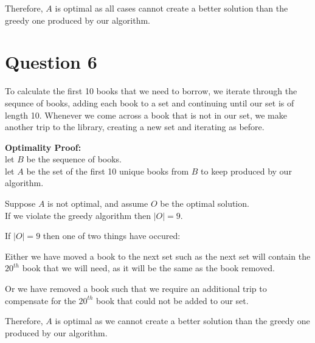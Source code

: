 \documentclass{article}
\begin{document}
Therefore, $A$ is optimal as all cases cannot create a better solution than the greedy one produced by our algorithm.

\section*{Question 6}
To calculate the first 10 books that we need to borrow, we iterate through the sequnce of books, adding each book to a set and continuing until our set is of length 10. Whenever we come across a book that is not in our set, we make another trip to the library, creating a new set and iterating as before.

\textbf{Optimality Proof:}\\
let $B$ be the sequence of books.\\
let $A$ be the set of the first 10 unique books from $B$ to keep produced by our algorithm.

Suppose $A$ is not optimal, and assume $O$ be the optimal solution.\\
If we violate the greedy algorithm then $|O| = 9$.

If $|O| = 9$ then one of two things have occured:

Either we have moved a book to the next set such as the next set will contain the $20^{th}$ book that we will need, as it will be the same as the book removed.

Or we have removed a book such that we require an additional trip to compensate for the $20^{th}$ book that could not be added to our set.

Therefore, $A$ is optimal as we cannot create a better solution than the greedy one produced by our algorithm.
\end{document}
